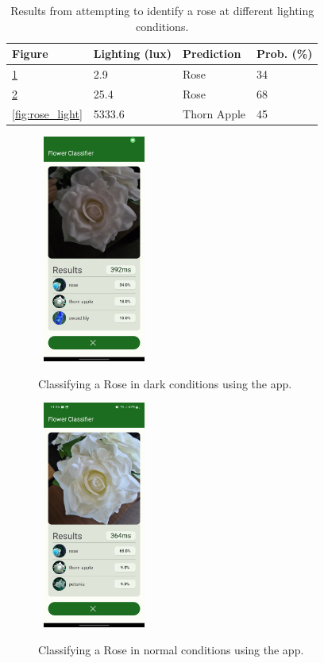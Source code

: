 \documentclass[12pt,a4paper]{report}
\begin{document}
\begin{table}[h!]
    \begin{tabular}{ |l|l|l|l| }
        \hline
        Figure & Lighting (lux) & Prediction & Prob. (\%)\\
        \hline
        \ref{fig:rose_dark} & 2.9 & Rose & 34 \\
        \hline
        \ref{fig:rose_med} & 25.4 & Rose & 68 \\
        \hline
        \ref{fig:rose_light} & 5333.6 & Thorn Apple & 45 \\
        \hline
    \end{tabular}
    \caption{Results from attempting to identify a rose at different lighting conditions.}
    \label{table:lighting}
\end{table}

\begin{figure}[h]\
    \includegraphics[width=0.3\textwidth]{rose_light_1.jpg}
    \caption{Classifying a Rose in dark conditions using the app.}
    \label{fig:rose_dark}
\end{figure}

\begin{figure}[h]\
    \includegraphics[width=0.3\textwidth]{rose_light_2.jpg}
    \caption{Classifying a Rose in normal conditions using the app.}
    \label{fig:rose_med}
\end{figure}
\end{document}
